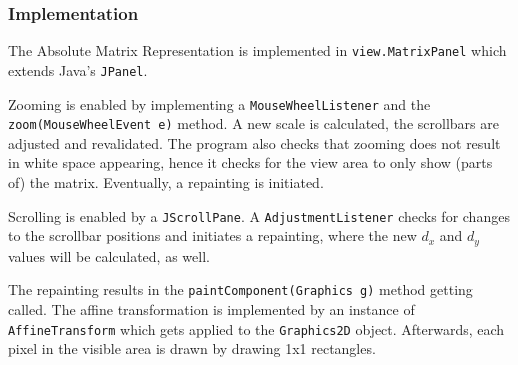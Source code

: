 \subsubsection{Implementation}
The Absolute Matrix Representation is implemented in \texttt{view.MatrixPanel} which extends Java's \texttt{JPanel}.

Zooming is enabled by implementing a \texttt{MouseWheelListener} and the \\
\texttt{zoom(MouseWheelEvent e)} method. A new scale is calculated, the scrollbars are adjusted and revalidated. The program also checks that zooming does not result in white space appearing, hence it checks for the view area to only show (parts of) the matrix. Eventually, a repainting is initiated. 

Scrolling is enabled by a \texttt{JScrollPane}. A \texttt{AdjustmentListener} checks for changes to the scrollbar positions and initiates a repainting, where the new $d_{x}$ and $d_{y}$ values will be calculated, as well.

The repainting results in the \texttt{paintComponent(Graphics g)} method getting called. The affine transformation is implemented by an instance of \\
\texttt{AffineTransform} which gets applied to the \texttt{Graphics2D} object. Afterwards, each pixel in the visible area is drawn by drawing 1x1 rectangles.